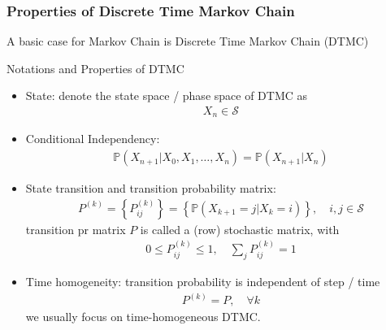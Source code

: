 \subsubsection{Properties of Discrete Time Markov Chain}\label{SubSubSectionDTMC}
A basic case for Markov Chain is Discrete Time Markov Chain (DTMC)

\begin{point}
    Notations and Properties of DTMC
\end{point}
\begin{itemize}[topsep=2pt,itemsep=0pt]
    \item State: denote the state space / phase space of DTMC as
    \begin{align}
        X_n\in \mathcal{S} 
    \end{align}
    \item Conditional Independency: 
    \begin{align*}
         \mathbb{P}\left( X_{n+1}\big|X_0,X_1,\ldots,X_n \right)=\mathbb{P}\left( X_{n+1}\big|X_n \right)  
    \end{align*}
    
    
    \item State transition and transition probability matrix:
    \begin{align}
        P^{(k)}=\left\{P^{(k)}_{ij}\right\}=\left\{ \mathbb{P}\left( X_{k+1}=j\big| X_{k}=i \right)  \right\},\quad i,j\in \mathcal{S}
    \end{align}
    transition pr matrix $ P $ is called a (row) stochastic matrix, with
    \begin{align}
        0\leq P^{(k)}_{ij}\leq 1,\quad \sum_{j}P^{(k)}_{ij}=1 
    \end{align}

    \item Time homogeneity: transition probability is independent of step / time
    \begin{align}
        P^{(k)}=P,\quad \forall k 
    \end{align}
    we usually focus on time-homogeneous DTMC.
    

\end{itemize}
